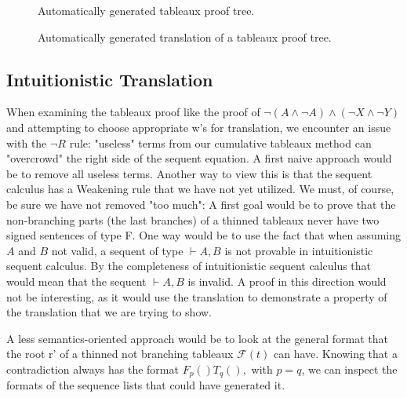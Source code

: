 \documentclass[runningheads]{llncs}
\begin{document}
\begin{figure}

    {\fontsize{1}{1}\selectfont
\ocmalImageIII

\caption{Automatically generated tableaux proof tree.}
\label{fig:destructive_tableaux}
    }
\end{figure}


\begin{figure}

    {\fontsize{1}{1}\selectfont
\ocmalImageIIII

\caption{Automatically generated translation of a tableaux proof tree.}
\label{fig:destructive_tableaux}
    }
\end{figure}


\newpage
\subsection{Intuitionistic Translation}


When examining the tableaux proof like the proof of  $\neg (A \land \neg A) \land (\neg X \land \neg Y)$ and attempting to choose 
appropriate w's for translation, we encounter an issue with the $\neg R$ rule: 
"useless" terms from our cumulative tableaux method can "overcrowd" the right side of the sequent equation. 
A first naive approach would be to remove all useless terms. Another way to view this is that the sequent calculus has a Weakening rule that we have not yet utilized.
\ThinningFunctionDefinition
We must, of course, be sure we have not removed "too much":
\thinnedInvalidityproof
\thinnedsizeproof
A first goal would be to prove that the non-branching parts (the last branches) of a thinned tableaux never have two signed sentences of type F.
One way would be to use the fact that when assuming $A$ and $B$ not valid, a sequent of type $ \vdash A, B$ is not provable in intuitionistic sequent calculus. 
By the completeness of intuitionistic sequent calculus that would mean that the sequent $ \vdash A, B$ is invalid. A proof in this direction would not be
 interesting, as it would use the translation to demonstrate a property of the translation that we are trying to show. 


 A less semantics-oriented approach would be to look at the general format that the root r' of a thinned not branching tableaux $\mathcal{F}(t)$ can have. Knowing 
 that a contradiction always has the format  $F_p ( ) T_q ( ), $ with $ p = q$, we can inspect the formats of the sequence lists that could have generated it.
\end{document}
